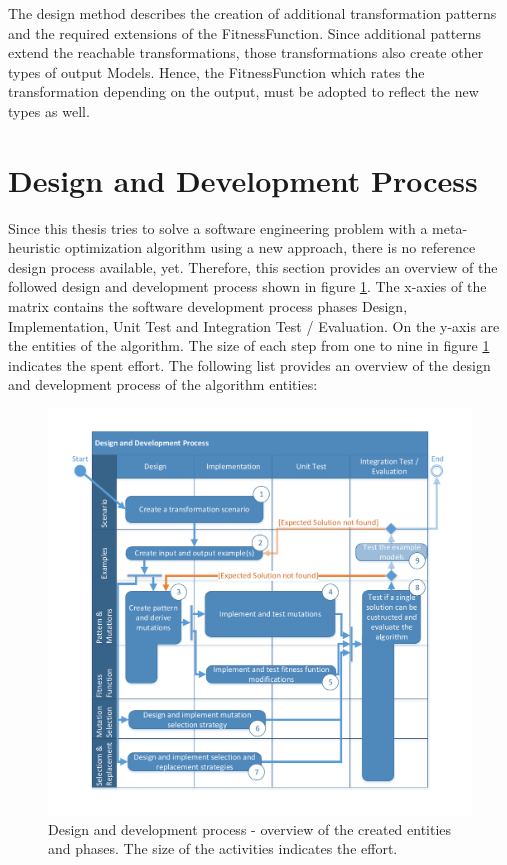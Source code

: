 The design method describes the creation of additional transformation patterns and the required extensions of the \gls{FitnessFunction}. Since additional patterns extend the reachable transformations, those transformations also create other types of output \glspl{Model}. Hence, the \gls{FitnessFunction} which rates the transformation depending on the output, must be adopted to reflect the new types as well.

\section{Design and Development Process}
\label{secDesignAndDevelopmentProcess}

Since this thesis tries to solve a software engineering problem with a meta-heuristic optimization algorithm using a new approach, there is no reference design process available, yet. Therefore, this section provides an overview of the followed design and development process shown in figure \ref{figDevelopmentProcess}. The x-axies of the matrix contains the software development process phases Design, Implementation, Unit Test and Integration Test / Evaluation. On the y-axis are the entities of the algorithm. The size of each step from one to nine in figure \ref{figDevelopmentProcess} indicates the spent effort. The following list provides an overview of the design and development process of the algorithm entities:

\begin{figure}[htb]
	\centering
	\includegraphics[scale=0.7, trim=0cm 1cm 0cm 1cm, clip=true]{Images/DevelopmentProcess.pdf} 
	\caption{Design and development process - overview of the created entities and phases. The size of the activities indicates the effort.}
	\label{figDevelopmentProcess}
\end{figure}

